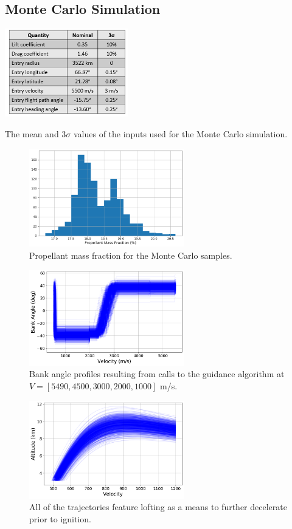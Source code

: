 \subsection{Monte Carlo Simulation}
\begin{table}[h!]
	\centering
	\includegraphics[width=0.4\textwidth]{../AAS20/DispersionTable} 
	\caption{The mean and $3\sigma$ values of the inputs used for the Monte Carlo simulation.}
	\label{table_input_dispersions}
\end{table}
\begin{figure}[h!]
	\centering
	\includegraphics[width=0.6\textwidth]{../AAS20/ignition_pmf} 
	\caption{Propellant mass fraction for the Monte Carlo samples.}
	\label{fig_mc_pmf}
\end{figure}
\begin{figure}[h!]
	\centering
	\includegraphics[width=0.6\textwidth]{../AAS20/bank_vel} 
	\caption{Bank angle profiles resulting from calls to the guidance algorithm at $ V=[5490, 4500, 3000, 2000, 1000] $ m/s.}
	\label{fig_mc_bank}
\end{figure}
\begin{figure}[h!]
	\centering
	\includegraphics[width=0.6\textwidth]{../AAS20/alt_vel_zoomed} 
	\caption{All of the trajectories feature lofting as a means to further decelerate prior to ignition.}
	\label{fig_mc_alt_vel}
\end{figure}
